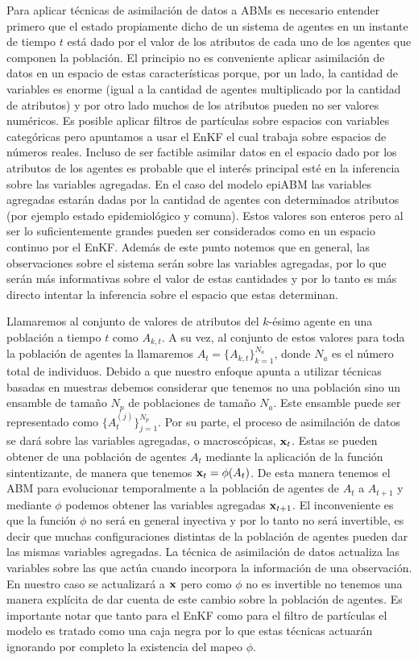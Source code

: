 Para aplicar técnicas de asimilación de datos a ABMs es necesario entender primero que el estado propiamente dicho de un sistema de agentes en un instante de tiempo $t$ está dado por el valor de los atributos de cada uno de los agentes que componen la población. El principio no es conveniente aplicar asimilación de datos en un espacio de estas características porque, por un lado, la cantidad de variables es enorme (igual a la cantidad de agentes multiplicado por la cantidad de atributos) y por otro lado muchos de los atributos pueden no ser valores numéricos. Es posible aplicar filtros de partículas sobre espacios con variables categóricas pero apuntamos a usar el EnKF el cual trabaja sobre espacios de números reales. Incluso de ser factible asimilar datos en el espacio dado por los atributos de los agentes es probable que el interés principal esté en la inferencia sobre las variables agregadas. En el caso del modelo epiABM las variables agregadas estarán dadas por la cantidad de agentes con determinados atributos (por ejemplo estado epidemiológico y comuna). Estos valores son enteros pero al ser lo suficientemente grandes pueden ser considerados como en un espacio continuo por el EnKF. Además de este punto notemos que en general, las observaciones sobre el sistema serán sobre las variables agregadas, por lo que serán más informativas sobre el valor de estas cantidades y por lo tanto es más directo intentar la inferencia sobre el espacio que estas determinan.

Llamaremos al conjunto de valores de atributos del $k$-ésimo agente en una población a tiempo $t$ como $A_{k, t}$. A su vez, al conjunto de estos valores para toda la población de agentes la llamaremos $A_t = \{ A_{k, t} \}_{k=1}^{N_a}$, donde $N_a$ es el número total de individuos. Debido a que nuestro enfoque apunta a utilizar técnicas basadas en muestras debemos considerar que tenemos no una población sino un ensamble de tamaño $N_p$ de poblaciones de tamaño $N_a$. Este ensamble puede ser representado como $\{ A_{t}^{(j)} \}_{j=1}^{N_p}$. Por su parte, el proceso de asimilación de datos se dará sobre las variables agregadas, o macroscópicas, $\mathbf{x}_t$. Estas se pueden obtener de una población de agentes $A_t$ mediante la aplicación de la función sintentizante, de manera que tenemos $\mathbf{x}_t = \phi (A_t)$. De esta manera tenemos el ABM para evolucionar temporalmente a la población de agentes de $A_t$ a $A_{t+1}$ y mediante $\phi$ podemos obtener las variables agregadas $\mathbf{x}_{t+1}$. El inconveniente es que la función $\phi$ no será en general inyectiva y por lo tanto no será invertible, es decir que muchas configuraciones distintas de la población de agentes pueden dar las mismas variables agregadas. La técnica de asimilación de datos actualiza las variables sobre las que actúa cuando incorpora la información de una observación. En nuestro caso se actualizará a $\mathbf{x}$ pero como $\phi$ no es invertible no tenemos una manera explícita de dar cuenta de este cambio sobre la población de agentes. Es importante notar que tanto para el EnKF como para el filtro de partículas el modelo es tratado como una caja negra por lo que estas técnicas actuarán ignorando por completo la existencia del mapeo $\phi$.

